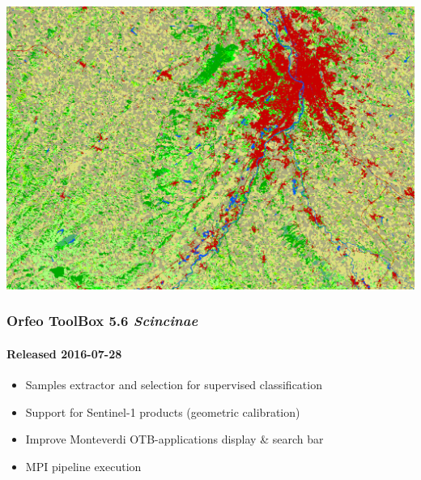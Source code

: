 \documentclass[smaller]{beamer}
\begin{document}
\vspace*{-6.5mm}
\begin{frame}[plain]
\hspace*{-11mm}
    \includegraphics[keepaspectratio,height=1.1\paperheight]{../../Courses/org/WorkshopGuide/Images/final_classification.png}
\end{frame}

\begin{frame}
  \frametitle{Orfeo ToolBox 5.6 \textit{Scincinae}}
  \framesubtitle{Released 2016-07-28}

\begin{itemize}
\item Samples extractor and selection for supervised classification
\item Support for Sentinel-1 products (geometric calibration)
\item Improve Monteverdi OTB-applications display \& search bar
\item MPI pipeline execution
\end{itemize}

\end{frame}
\end{document}

